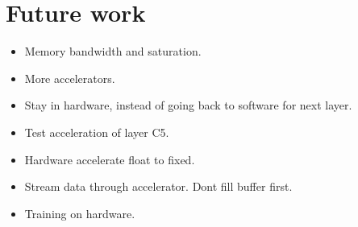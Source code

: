 \chapter{Future work}

\begin{itemize}
	\item Memory bandwidth and saturation.
	\item More accelerators. 
	\item Stay in hardware, instead of going back to software for next layer. 
	\item Test acceleration of layer C5.
	\item Hardware accelerate float to fixed. 
	\item Stream data through accelerator. Dont fill buffer first.
	\item Training on hardware. 
	
\end{itemize}
